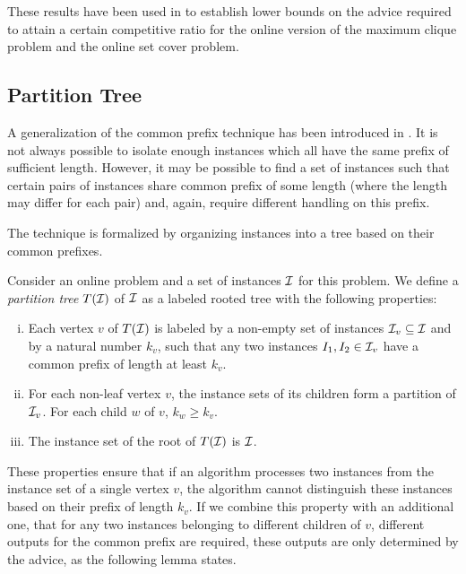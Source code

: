These results have been used in \cite{string-guessing} to establish lower
bounds on the advice required to attain a certain competitive ratio for
the online version of the maximum clique problem and the online set cover
problem.

\subsection{Partition Tree}
\label{section:partition-tree}

A generalization of the common prefix technique has been introduced in
\cite{sofsem2014}. It is not always possible to isolate enough instances
which all have the same prefix of sufficient length. However, it may be
possible to find a set of instances such that certain pairs of instances
share common prefix of some length (where the length may differ for each
pair) and, again, require different handling on this prefix.

The technique is formalized by organizing instances into a tree based on
their common prefixes.

\begin{definition}\label{definition:partition-tree}
    Consider an online problem and a set of instances $\mathcal{I}$ for this problem.
    We define a \emph{partition tree} $T(\mathcal{I})$ of $\mathcal{I}$ as a labeled rooted
    tree with the following properties:
    \begin{enumerate}[(i)]
        \item Each vertex $v$ of $T(\mathcal{I})$ is labeled by a non-empty set of
            instances $\mathcal{I}_v \subseteq \mathcal{I}$ and by a natural number $k_v$,
            such that any two instances $I_1, I_2 \in \mathcal{I}_v$ have a common
            prefix of length at least $k_v$.

        \item For each non-leaf vertex $v$, the instance sets of its
            children form a partition of $\mathcal{I}_v$. For each child $w$ of
            $v$, $k_w \geq k_v$.

        \item The instance set of the root of $T(\mathcal{I})$ is $\mathcal{I}$.
    \end{enumerate}
\end{definition}

These properties ensure that if an algorithm processes two instances from
the instance set of a single vertex $v$, the algorithm cannot distinguish
these instances based on their prefix of length $k_v$. If we combine this
property with an additional one, that for any two instances belonging to
different children of $v$, different outputs for the common prefix are
required, these outputs are only determined by the advice, as the
following lemma states.


